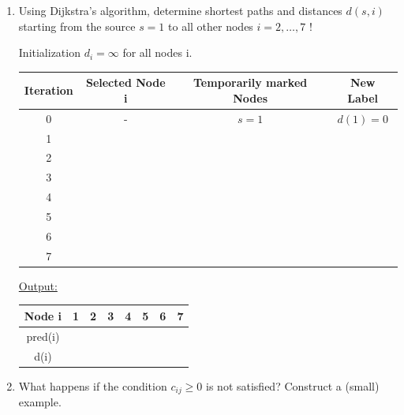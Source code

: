 \begin{enumerate}
	\item Using Dijkstra's algorithm, determine shortest paths and distances $d(s,i)$ starting from the source $s = 1$ to all other nodes $i=2,\ldots,7$ !
	
	\begin{solution}
	Initialization $d_i=\infty$ for all nodes i.
	\begin{center}
			\begin{tabular}{c|c|c|c}
			Iteration&Selected Node i&Temporarily marked Nodes&New Label\\
			\hline
			0&-&$s=1$&$d\left(1\right)=0$\\
			1&\phantom{1}&\phantom{$2,3,4$}&\phantom{$d\left(2\right)=5$, $d\left(3\right)=3$, $d\left(4\right)=2$}\\
			2&\phantom{4}&\phantom{$2,3,5,6,7$}&\phantom{$d\left(5\right)=4$, $d\left(6\right)=3$, $d\left(7\right)=9$}\\
			3&\phantom{3}&\phantom{$2,5,6,7$}&\\
			4&\phantom{6}&\phantom{$2,5,7$}&\phantom{$d\left(7\right)=8$}\\
			5&\phantom{5}&\phantom{$2,7$}&\\
			6&\phantom{2}&\phantom{$7$}&\\
			7&\phantom{7}&\phantom{-}&\\
			\end{tabular}
		\end{center}
	\uline{Output:}
	\begin{center}
		\begin{tabular}{|c|ccccccc|}
		\hline
		Node i&1&2&3&4&5&6&7\\
		\hline
		pred(i)&\phantom{-}&\phantom{1}&\phantom{1}&\phantom{1}&\phantom{4}&\phantom{4}&\phantom{6}\\
		\hline
		d(i)&\phantom{0}&\phantom{5}&\phantom{3}&\phantom{2}&\phantom{4}&\phantom{3}&\phantom{8}\\
		\hline
		\end{tabular}
	\end{center}
	\end{solution}
	
	\item What happens if the condition $c_{ij} \geq 0$ is not satisfied? Construct a (small) example.
	\begin{solution}
	

\end{solution}
\end{enumerate}
